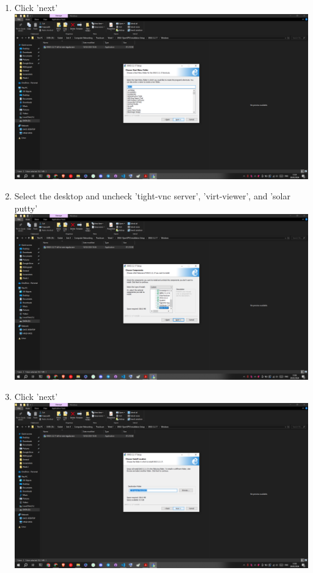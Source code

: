 \documentclass[12pt,titlepage]{article}
\begin{document}
\begin{enumerate}
    \item Click 'next' \\ \includegraphics[width=.9\textwidth]{images/figures/Screenshot (425).png}
    \newpage
    \item Select the desktop and uncheck 'tight-vnc server', 'virt-viewer', and 'solar putty' \\ \includegraphics[width=.9\textwidth]{images/figures/Screenshot (427).png}
    \item Click 'next' \\ \includegraphics[width=.9\textwidth]{images/figures/Screenshot (428).png}
    \newpage

\end{enumerate}
\end{document}
